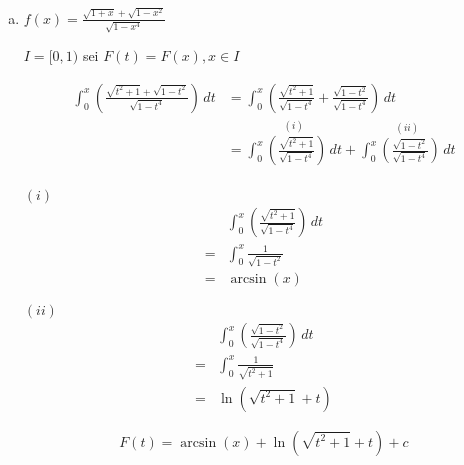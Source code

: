 \documentclass{article}
\begin{document}
\begin{enumerate}[a)]
\newpage
\item $f(x) = \frac{\sqrt{1 + x} + \sqrt{1 - x^2}}{\sqrt{1 - x^4}}$

  $I = [0, 1)$ sei $F(t) = F(x), x \in I$

  \begin{align*}
    \int_0^x \left( \frac{\sqrt{t^2 + 1} + \sqrt{1 - t^2}}{\sqrt{1 - t^4}}\right) \,dt
    &= \int_0^x \left( \frac{\sqrt{t^2 + 1}}{\sqrt{1 - t^4}} + \frac{\sqrt{1 - t^2}}{\sqrt{1 - t^4}}\right) \,dt \\
    &= \overset{(i)}{\int_0^x \left( \frac{\sqrt{t^2 + 1}}{\sqrt{1 - t^4}}\right) \,dt} +
       \overset{(ii)}{\int_0^x \left(\frac{\sqrt{1 - t^2}}{\sqrt{1 - t^4}}\right) \,dt} \\
  \end{align*}
  \begin{minipage}[t]{.45\textwidth}
    \textbf{$(i)$}
    \begin{align*}
      &\int_0^x \left( \frac{\sqrt{t^2 + 1}}{\sqrt{1 - t^4}}\right) \,dt \\
      = & \int_0^x \frac{1}{\sqrt{1 - t^2}} \\
      = & \arcsin (x)
    \end{align*}
  \end{minipage}
  \hfill
  \begin{minipage}[t]{.45\textwidth}
    \textbf{$(ii)$}
    \begin{align*}
      &\int_0^x\left( \frac{\sqrt{1 - t^2}}{\sqrt{1 - t^4}}\right) \,dt \\
      = & \int_0^x \frac{1}{\sqrt{t^2 + 1}} \\
      = & \ln \left( \sqrt{t^2 + 1} + t\right)
    \end{align*}
  \end{minipage}
  \[
    F(t) = \arcsin (x) + \ln \left( \sqrt{t^2 + 1} + t\right) + c
  \]
\end{enumerate}
\end{document}

